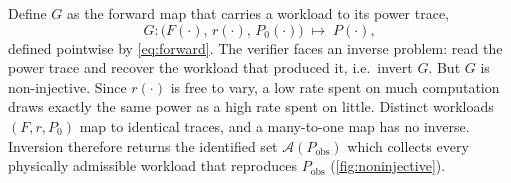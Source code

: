 \documentclass{article}
\theoremstyle{plain}
\theoremstyle{definition}
\theoremstyle{remark}
\begin{document}
Define $G$ as the forward map that carries a workload to its power trace,
\begin{equation}
	G : \bigl(F(\cdot),\, r(\cdot),\, P_0(\cdot)\bigr) \;\longmapsto\; P(\cdot),
	\label{eq:operator}
\end{equation}
defined pointwise by \cref{eq:forward}. The verifier faces an inverse
problem: read the power trace and recover the workload that produced it,
i.e.\ invert $G$. But $G$ is non-injective. Since $r(\cdot)$ is free
to vary, a low rate spent on much computation draws exactly the same power as
a high rate spent on little. Distinct workloads $(F,r,P_0)$ map to identical
traces, and a many-to-one map has no inverse. Inversion therefore returns the identified set $\mathcal{A}(P_{\mathrm{obs}})$ which
collects every physically admissible workload that reproduces
$P_{\mathrm{obs}}$ (\cref{fig:noninjective}).
\end{document}
